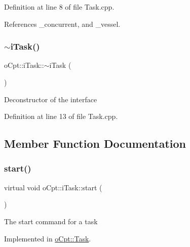 Definition at line 8 of file Task.\+cpp.



References \+\_\+concurrent, and \+\_\+vessel.

\hypertarget{classo_cpt_1_1i_task_aa2c1053421fff92430b5912e0d3c7fc7}{}\label{classo_cpt_1_1i_task_aa2c1053421fff92430b5912e0d3c7fc7} 
\subsubsection{\texorpdfstring{$\sim$i\+Task()}{~iTask()}}
{\footnotesize\ttfamily o\+Cpt\+::i\+Task\+::$\sim$i\+Task (\begin{DoxyParamCaption}{ }\end{DoxyParamCaption})\hspace{0.3cm}{\ttfamily [virtual]}}

Deconstructor of the interface 

Definition at line 13 of file Task.\+cpp.



\subsection{Member Function Documentation}
\hypertarget{classo_cpt_1_1i_task_aedd48e3c4df48aaae0738ce3863e222f}{}\label{classo_cpt_1_1i_task_aedd48e3c4df48aaae0738ce3863e222f} 
\subsubsection{\texorpdfstring{start()}{start()}}
{\footnotesize\ttfamily virtual void o\+Cpt\+::i\+Task\+::start (\begin{DoxyParamCaption}{ }\end{DoxyParamCaption})\hspace{0.3cm}{\ttfamily [pure virtual]}}

The start command for a task 

Implemented in \hyperlink{classo_cpt_1_1_task_a8acd8d2125df0aef37eb1ebf0e3e49c8}{o\+Cpt\+::\+Task}.

\hypertarget{classo_cpt_1_1i_task_a8d6126b2e337a0ab39fdef1d8d7b73b9}{}\label{classo_cpt_1_1i_task_a8d6126b2e337a0ab39fdef1d8d7b73b9} 
